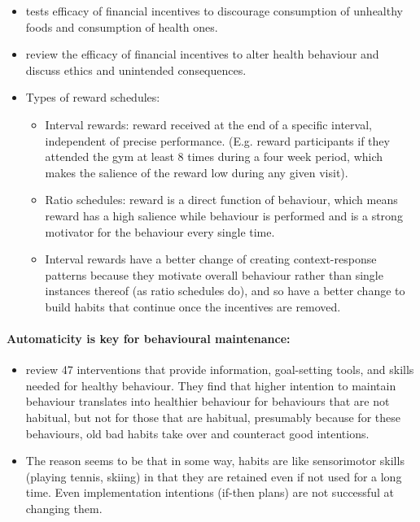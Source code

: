 \documentclass[a4paper, 11pt]{report}
\begin{document}
\begin{itemize}
	\item \citet{an2013effectiveness} tests efficacy of financial incentives to discourage consumption of unhealthy foods and consumption of health ones.

	\item \citet{marteau2009using} review the efficacy of financial incentives to alter health behaviour and discuss ethics and unintended consequences.

	\item Types of reward schedules:
	\begin{itemize}
		\item Interval rewards: reward received at the end of a specific interval, independent of precise performance. (E.g. \citet{charness2009incentives} reward participants if they attended the gym at least 8 times during a four week period, which makes the salience of the reward low during any given visit).
		\item Ratio schedules: reward is a direct function of behaviour, which means reward has a high salience while behaviour is performed and is a strong motivator for the behaviour every single time.
		\item Interval rewards have a better change of creating context-response patterns because they motivate overall behaviour rather than single instances thereof (as ratio schedules do), and so have a better change to build habits that continue once the incentives are removed.
	\end{itemize}
\end{itemize}

\paragraph{Automaticity is key for behavioural maintenance:}

\begin{itemize}
	\item \citet{webb2006does} review 47 interventions that provide information, goal-setting tools, and skills needed for healthy behaviour. They find that higher intention to maintain behaviour translates into healthier behaviour for behaviours that are not habitual, but not for those that are habitual, presumably because for these behaviours, old bad habits take over and counteract good intentions.

	\item The reason seems to be that in some way, habits are like sensorimotor skills (playing tennis, skiing) in that they are retained even if not used for a long time. Even implementation intentions (if-then plans) \citep{gollwitzer2006implementation} are not successful at changing them.
\end{itemize}
\end{document}

